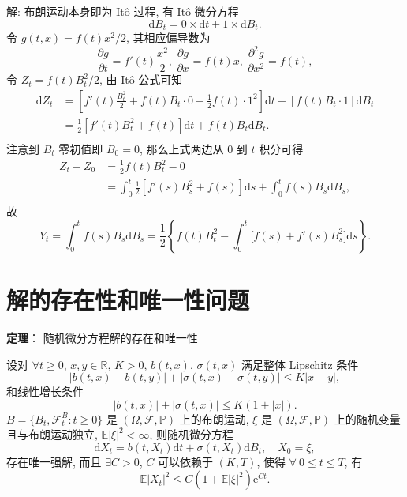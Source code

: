 \documentclass[openany]{ctexbook}
\theoremstyle{kaiti}
\theoremstyle{normal}
\begin{document}
解: 布朗运动本身即为 It\^o 过程, 有 It\^o 微分方程
\begin{equation}
  \mathrm{d}B_t=0\times\mathrm{d}t+1\times\mathrm{d}B_t.
\end{equation}
令 $g(t,x)=f(t)x^2/2$, 其相应偏导数为
\begin{equation}
  \frac{\partial g}{\partial t}=f'(t)\frac{x^2}{2},~
  \frac{\partial g}{\partial x}=f(t)x,~
  \frac{\partial^2 g}{\partial x^2}=f(t),
\end{equation}
令 $Z_t=f(t)B_t^2/2$, 由 It\^o 公式可知
\begin{equation}
  \begin{aligned}
    \mathrm{d}Z_t
    &=\left[f'(t)\frac{B_t^2}{2}+f(t)B_t\cdot0+\frac{1}{2}f(t)\cdot1^2\right]\mathrm{d}t+[f(t)B_t\cdot1]\mathrm{d}B_t\\
    &=\frac{1}{2}[f'(t)B_t^2+f(t)]\mathrm{d}t+f(t)B_t\mathrm{d}B_t.\\
  \end{aligned}
\end{equation}
注意到 $B_t$ 零初值即 $B_0=0$, 那么上式两边从 $0$ 到 $t$ 积分可得
\begin{equation}
  \begin{aligned}
    Z_t-Z_0
    &=\frac{1}{2}f(t)B_t^2-0\\
    &=\int_0^t\frac{1}{2}\left[f'(s)B_s^2+f(s)\right]\mathrm{d}s+\int_0^tf(s)B_s\mathrm{d}B_s,\\
  \end{aligned}
\end{equation}
故
\begin{equation}
  Y_t=\int_0^tf(s)B_s\mathrm{d}B_s=\frac{1}{2}\left\{f(t)B_t^2-\int_0^t\Big[f(s)+f'(s)B_s^2\Big]\mathrm{d}s\right\}.
\end{equation}

\section{解的存在性和唯一性问题}

\textbf{定理}： 随机微分方程解的存在和唯一性

设对 $\forall t\geqslant0$, $x,y\in\mathbb{R}$, $K>0$, $b(t,x)$, $\sigma(t,x)$ 满足整体 Lipschitz 条件
\begin{equation}
  |b(t,x)-b(t,y)|+|\sigma(t,x)-\sigma(t,y)|\leqslant K|x-y|,
\end{equation}
和线性增长条件
\begin{equation}
  |b(t,x)|+|\sigma(t,x)|\leqslant K(1+|x|).
\end{equation}
$B=\{B_t,\mathcal{F}_t^B:t\geqslant0\}$ 是 $(\Omega,\mathcal{F},\mathbb{P})$ 上的布朗运动, $\xi$ 是 $(\Omega,\mathcal{F},\mathbb{P})$ 上的随机变量且与布朗运动独立, $\mathbb{E}|\xi|^2<\infty$, 则随机微分方程
\begin{equation}
  \mathrm{d}X_t=b(t,X_t)\mathrm{d}t+\sigma(t,X_t)\mathrm{d}B_t,\quad X_0=\xi,
\end{equation}
存在唯一强解, 而且 $\exists C>0$, $C$ 可以依赖于 $(K,T)$, 使得 $\forall~0\leqslant t\leqslant T$, 有
\begin{equation}
  \mathbb{E}|X_t|^2\leqslant C(1+\mathbb{E}|\xi|^2)\mathrm{e}^{Ct}.
\end{equation}
\end{document}
